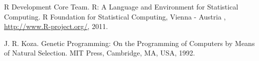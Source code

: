 
\begin{thebibliography}{10}

{\sc R Development Core Team}. {R: A Language and Environment for Statistical Computing}. R Foundation for Statistical Computing, Vienna - Austria , \url{http://www.R-project.org/}, 2011.



{\sc J. R. Koza}. {Genetic Programming: On the Programming of Computers by Means of Natural Selection}. MIT Press, Cambridge, MA, USA, 1992.

\end{thebibliography}
